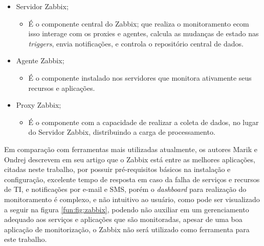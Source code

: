 \begin{itemize}
\item Servidor Zabbix;
    \begin{itemize}
        \item É o componente central do Zabbix; que realiza o monitoramento ecom isso interage com os proxies e agentes, calcula as mudanças de estado nas \textit{triggers}, envia notificações, e controla o repositório central de dados.
    \end{itemize}
\item Agente Zabbix;
\begin{itemize}
        \item É o componente instalado nos servidores que monitora ativamente seus recursos e aplicações.
    \end{itemize}
\item Proxy Zabbix;
\begin{itemize}
        \item É o componente com a capacidade de realizar a coleta de dados, no lugar do Servidor Zabbix, distribuindo a carga de processamento.
    \end{itemize}
\end{itemize}

Em comparação com ferramentas mais utilizadas atualmente, os autores Marik e Ondrej \cite{marik2014comparative} descrevem em seu artigo que o Zabbix está entre as melhores aplicações, citadas neste trabalho, por possuir pré-requisitos básicos na instalação e configuração, excelente tempo de resposta em caso da falha de serviços e recursos de \acrshort{TI}, e notificações por e-mail e \acrshort{SMS}, porém o \textit{dashboard} para realização do monitoramento é complexo, e não intuitivo ao usuário, como pode ser visualizado a seguir na figura \ref{fun:fig:zabbix}, podendo não auxiliar em um gerenciamento adequado aos serviços e aplicações que são monitoradas, apesar de uma boa aplicação de monitorização, o Zabbix não será utilizado como ferramenta para este trabalho.    


